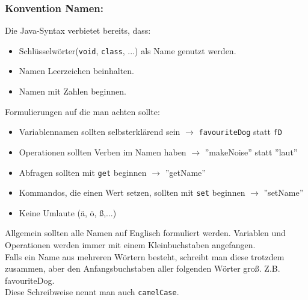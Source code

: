 \vspace{5mm}

\subsubsection*{Konvention Namen:}

\begin{Infobox}
	Die Java-Syntax verbietet bereits, dass:

	\begin{itemize}
		\item Schlüsselwörter(\lstinline{void}, \lstinline{class}, ...) als Name genutzt werden.
		\item Namen Leerzeichen beinhalten.
		\item Namen mit Zahlen beginnen.
	\end{itemize}
\end{Infobox}
\vspace{5mm}
\begin{Infobox}
	Formulierungen auf die man achten sollte:
	\begin{itemize}
		\item Variablennamen sollten selbsterklärend sein $\rightarrow$ \lstinline{favouriteDog} statt \lstinline{fD}
		\item Operationen sollten Verben im Namen haben $\rightarrow$ ''makeNoise'' statt ''laut''
		\item Abfragen sollten mit \lstinline{get} beginnen $\rightarrow$ ''getName''
		\item Kommandos, die einen Wert setzen, sollten mit \lstinline{set} beginnen $\rightarrow$ ''setName''
		\item Keine Umlaute (ä, ö, ß,...)

	\end{itemize}
\end{Infobox}

\vspace{5mm}

\noindent
Allgemein sollten alle Namen auf Englisch formuliert werden.
Variablen und Operationen werden immer mit einem Kleinbuchstaben angefangen.\\

\noindent
Falls ein Name aus mehreren Wörtern besteht, schreibt man diese trotzdem zusammen, aber den Anfangsbuchstaben aller folgenden Wörter groß. Z.B. favouriteDog.\\
Diese Schreibweise nennt man auch \lstinline{camelCase}.\\

